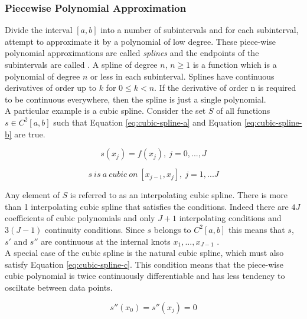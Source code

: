 \subsubsection{Piecewise Polynomial Approximation}

Divide the interval $[a,b]$ into a number of subintervals and for each subinterval, attempt to approximate it by a polynomial of low degree. These piece-wise polynomial approximations are called \textit{splines} and the endpoints of the subintervals are called \cite{intro-to-numerical-analysis-suli}. A spline of degree $n$, $n \geq 1$ is a function which is a polynomial of degree $n$ or less in each subinterval. Splines have continuous derivatives of order up to $k$ for $0 \leq k < n$. If the derivative of order n is required to be continuous everywhere, then the spline is just a single polynomial. \\

A particular example is a cubic spline. Consider the set $S$ of all functions $s \in C^2[a,b]$ such that Equation \ref{eq:cubic-spline-a} and Equation \ref{eq:cubic-spline-b} are true.

\begin{equation}
\label{eq:cubic-spline-a}
    s(x_j) = f(x_j),\ j = 0,...,J
\end{equation}

\begin{equation}
\label{eq:cubic-spline-b}
    s\ is\ a\ cubic\ on\ [x_{j-1}, x_j],\ j=1,...J
\end{equation}

Any element of $S$ is referred to as an interpolating cubic spline. There is more than 1 interpolating cubic spline that satisfies the conditions. Indeed there are $4J$  coefficients of cubic polynomials and only $J+1$ interpolating conditions and $3(J-1)$ continuity conditions. Since $s$ belongs to $C^2[a, b]$ this means that $s$, $s'$ and $s''$ are continuous at the internal knots $x_1, ..., x_{J-1}$ \cite{intro-to-numerical-analysis-suli}. \\

A special case of the cubic spline is the natural cubic spline, which must also satisfy Equation \ref{eq:cubic-spline-c}. This condition means that the piece-wise cubic polynomial is twice continuously differentiable and has less tendency to osciltate between data points.

\begin{equation}
    \label{eq:cubic-spline-c}
     s''(x_0) = s''(x_j) = 0
\end{equation}

